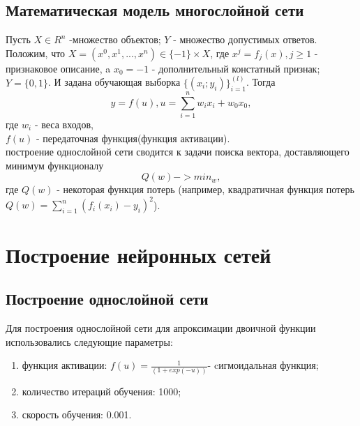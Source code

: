 \documentclass[a4paper,12pt,twoside]{article}
\begin{document}
	\bigskip
	\subsection{Математическая модель многослойной сети}
	\bigskip
		Пусть $X \in R^n$ -множество объектов; $Y$ - множество допустимых ответов. Положим, что
	$X = (x^0, x^1, ..., x^n) \in \{-1\} \times X$, где $x^j = f_j(x), j \geq 1$ - признаковое описание, a $x_0 = -1$ - дополнительный констатный признак; $Y = \{0, 1\}$. И задана обучающая выборка $\{(x_i;y_i)\}_{i=1}^{(l)}$. Тогда \\
	\begin{equation}
	y = f(u), u = \sum_{i=1}^{n}w_ix_i + w_0x_0,
	\end{equation}
	где $w_i$ - веса входов,\\
	$f(u)$ - передаточная функция(функция активации).\\
	
	 построение однослойной сети сводится к задачи поиска вектора, доставляющего минимум функционалу
	\begin{equation}
	Q(w) -> min_{w},
	\end{equation}
	где $Q(w)$ - некоторая функция потерь (например, квадратичная функция потерь $Q(w) = \sum_{i=1}^n(f_i(x_i) - y_i)^2$).
	
	\newpage
	\section{Построение нейронных сетей}
	\bigskip
	\subsection{Построение однослойной сети}
	\bigskip
	Для построения однослойной сети для апроксимации двоичной функции использовались следующие параметры:
	\begin{enumerate}
		\item функция активации: $f(u) = \frac{1}{(1 + exp(-u))}$- cигмоидальная функция;
		\item количество итераций обучения: 1000;
		\item скорость обучения: 0.001.
	\end{enumerate}
	

	
\end{document}

